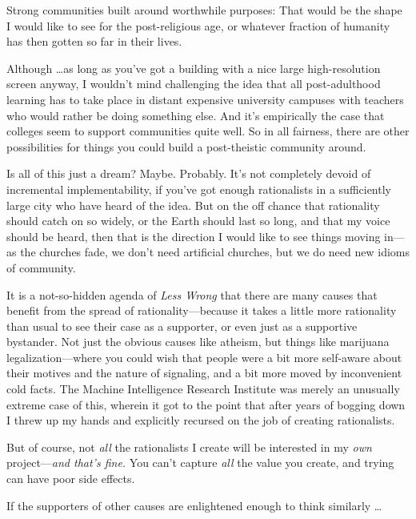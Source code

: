 {
 Strong communities built around worthwhile purposes: That would be
the shape I would like to see for the post-religious age, or whatever
fraction of humanity has then gotten so far in their lives.}

{
 Although \ldots as long as you've got a building
with a nice large high-resolution screen anyway, I
wouldn't mind challenging the idea that all
post-adulthood learning has to take place in distant expensive
university campuses with teachers who would rather be doing something
else. And it's empirically the case that colleges seem
to support communities quite well. So in all fairness, there are other
possibilities for things you could build a post-theistic community
around.}

{
 Is all of this just a dream? Maybe. Probably. It's
not completely devoid of incremental implementability, if
you've got enough rationalists in a sufficiently large
city who have heard of the idea. But on the off chance that rationality
should catch on so widely, or the Earth should last so long, and that
my voice should be heard, then that is the direction I would like to
see things moving in---as the churches fade, we don't
need artificial churches, but we do need new idioms of community.}

\myendsectiontext


{
 It is a not-so-hidden agenda of \textit{Less Wrong} that there are
many causes that benefit from the spread of rationality---because it
takes a little more rationality than usual to see their case as a
supporter, or even just as a supportive bystander. Not just the obvious
causes like atheism, but things like marijuana legalization---where you
could wish that people were a bit more self-aware about their motives
and the nature of signaling, and a bit more moved by inconvenient cold
facts. The Machine Intelligence Research Institute was merely an
unusually extreme case of this, wherein it got to the point that after
years of bogging down I threw up my hands and explicitly recursed on
the job of creating rationalists. }

{
 But of course, not \textit{all} the rationalists I create will be
interested in my \textit{own} project---\textit{and
that's fine.} You can't capture
\textit{all} the value you create, and trying can have poor side
effects.}

{
 If the supporters of other causes are enlightened enough to think
similarly \ldots}

